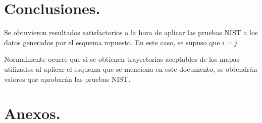 \documentclass[10pt]{IEEEtran}
\begin{document}
\section{Conclusiones.}

Se obtuvieron resultados satisfactorios a la hora de aplicar las pruebas NIST a los datos generados por el esquema ropuesto. En este caso, se supuso que $i = j$. 

Normalmente ocurre que si se obtienen trayectorias aceptables de los mapas utilizados al aplicar el esquema que se menciona en este documento, se obtendrán valores que aprobarán las pruebas NIST.

\onecolumn
\section{Anexos.}
\end{document}
